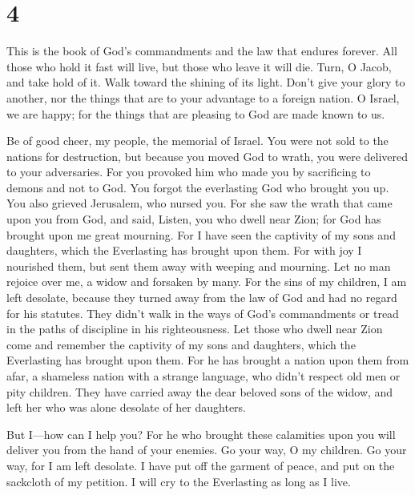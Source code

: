 \hypertarget{section-3}{%
\section{4}\label{section-3}}

 This is the book of God's commandments and the law that
endures forever. All those who hold it fast will live, but those who
leave it will die.  Turn, O Jacob, and take hold of it. Walk
toward the shining of its light.  Don't give your glory to
another, nor the things that are to your advantage to a foreign nation.
 O Israel, we are happy; for the things that are pleasing to
God are made known to us.

 Be of good cheer, my people, the memorial of Israel.
 You were not sold to the nations for destruction, but
because you moved God to wrath, you were delivered to your adversaries.
 For you provoked him who made you by sacrificing to demons
and not to God.  You forgot the everlasting God who brought
you up. You also grieved Jerusalem, who nursed you.  For she
saw the wrath that came upon you from God, and said, Listen, you who
dwell near Zion; for God has brought upon me great mourning.
 For I have seen the captivity of my sons and daughters,
which the Everlasting has brought upon them.  For with joy
I nourished them, but sent them away with weeping and mourning.
 Let no man rejoice over me, a widow and forsaken by many.
For the sins of my children, I am left desolate, because they turned
away from the law of God  and had no regard for his
statutes. They didn't walk in the ways of God's commandments or tread in
the paths of discipline in his righteousness.  Let those
who dwell near Zion come and remember the captivity of my sons and
daughters, which the Everlasting has brought upon them. 
For he has brought a nation upon them from afar, a shameless nation with
a strange language, who didn't respect old men or pity children.
 They have carried away the dear beloved sons of the widow,
and left her who was alone desolate of her daughters.

 But I---how can I help you?  For he who
brought these calamities upon you will deliver you from the hand of your
enemies.  Go your way, O my children. Go your way, for I am
left desolate.  I have put off the garment of peace, and
put on the sackcloth of my petition. I will cry to the Everlasting as
long as I live.

